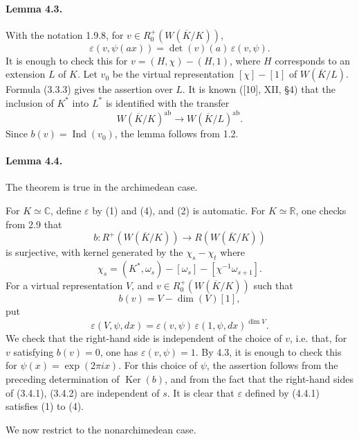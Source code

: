 \documentclass[10pt]{article}
\newcommand{\C}{\mathbb C}
\newcommand{\Ind}{\operatorname{Ind}}
\providecommand{\Ker}{\operatorname{Ker}}
\providecommand{\ab}{\mathrm{ab}}
\providecommand{\R}{\mathbb R}
\providecommand{\ab}{\mathrm{ab}}
\begin{document}
\paragraph{Lemma 4.3.} With the notation 1.9.8, for \(v\in R^+_0(W(\overline K/K))\),
\[
\varepsilon(v,\psi(ax))=\det(v)(a)\,\varepsilon(v,\psi).
\]
It is enough to check this for \(v=(H,\chi)-(H,1)\), where \(H\) corresponds to an extension \(L\) of \(K\). Let \(v_0\) be the virtual representation \([\chi]-[1]\) of \(W(\overline K/L)\). Formula (3.3.3) gives the assertion over \(L\). It is known ([10], XII, §4) that the inclusion of \(K^*\) into \(L^*\) is identified with the transfer
\[
W(\overline K/K)^{\ab}\longrightarrow W(\overline K/L)^{\ab}.
\]
Since \(b(v)=\Ind(v_0)\), the lemma follows from 1.2.

\paragraph{Lemma 4.4.} The theorem is true in the archimedean case.

For \(K\simeq\C\), define \(\varepsilon\) by (1) and (4), and (2) is automatic. For \(K\simeq\R\), one checks from 2.9 that
\[
b:R^+(W(\overline K/K))\longrightarrow R(W(\overline K/K))
\]
is surjective, with kernel generated by the \(\chi_s-\chi_t\) where
\[
\chi_s=(K^*,\omega_s)-[\omega_s]-[\chi^{-1}\omega_{s+1}].
\]
For a virtual representation \(V\), and \(v\in R^+_0(W(\overline K/K))\) such that
\[
b(v)=V-\dim(V)[1],
\]
put
\[
\tag{4.4.1}
\varepsilon(V,\psi,dx)=\varepsilon(v,\psi)\,\varepsilon(1,\psi,dx)^{\dim V}.
\]
We check that the right-hand side is independent of the choice of \(v\), i.e. that, for \(v\) satisfying \(b(v)=0\), one has \(\varepsilon(v,\psi)=1\). By 4.3, it is enough to check this for \(\psi(x)=\exp(2\pi ix)\). For this choice of \(\psi\), the assertion follows from the preceding determination of \(\Ker(b)\), and from the fact that the right-hand sides of (3.4.1), (3.4.2) are independent of \(s\). It is clear that \(\varepsilon\) defined by (4.4.1) satisfies (1) to (4).

We now restrict to the nonarchimedean case.
\end{document}
